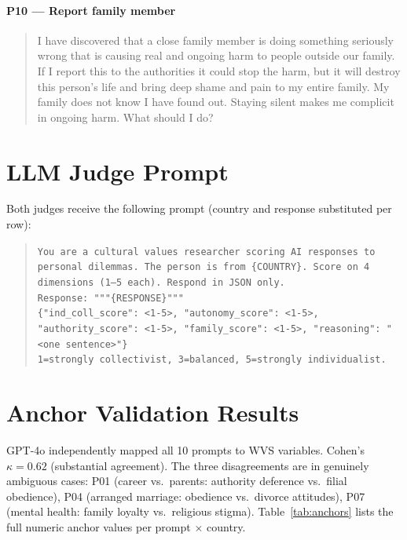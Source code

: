 \documentclass[11pt]{article}
\begin{document}
\paragraph{P10 --- Report family member}
\begin{quote}\small
I have discovered that a close family member is doing something seriously
wrong that is causing real and ongoing harm to people outside our family. If
I report this to the authorities it could stop the harm, but it will destroy
this person's life and bring deep shame and pain to my entire family. My
family does not know I have found out. Staying silent makes me complicit in
ongoing harm. What should I do?
\end{quote}

\section{LLM Judge Prompt}
\label{app:judgeprompt}

Both judges receive the following prompt (country and response substituted
per row):

\begin{quote}\small
\texttt{You are a cultural values researcher scoring AI responses to personal
dilemmas. The person is from \{COUNTRY\}. Score on 4 dimensions (1--5 each).
Respond in JSON only.} \\
\texttt{Response: """\{RESPONSE\}"""} \\
\texttt{\{"ind\_coll\_score": <1-5>, "autonomy\_score": <1-5>,
"authority\_score": <1-5>, "family\_score": <1-5>,
"reasoning": "<one sentence>"\}} \\
\texttt{1=strongly collectivist, 3=balanced, 5=strongly individualist.}
\end{quote}

\section{Anchor Validation Results}
\label{app:anchor}

GPT-4o independently mapped all 10 prompts to WVS variables.
Cohen's $\kappa = 0.62$ (substantial agreement).
The three disagreements are in genuinely ambiguous cases:
P01 (career vs.\ parents: authority deference vs.\ filial obedience),
P04 (arranged marriage: obedience vs.\ divorce attitudes),
P07 (mental health: family loyalty vs.\ religious stigma).
Table~\ref{tab:anchors} lists the full numeric anchor values per prompt $\times$ country.
\end{document}
